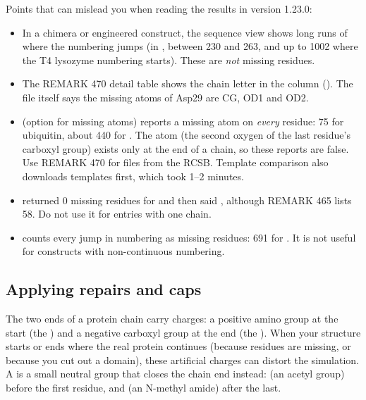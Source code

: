 \begin{watchout}
Points that can mislead you when reading the results in version 1.23.0:
\begin{itemize}
  \item In a chimera or engineered construct, the sequence view shows long
        runs of \prompt{-} where the numbering jumps (in , between
        230 and 263, and up to 1002 where the T4 lysozyme numbering starts).
        These are \emph{not} missing residues.
  \item The REMARK 470 detail table shows the chain letter in the
         column (). The file itself says the
        missing atoms of Asp29 are CG, OD1 and OD2.
  \item {} (option  for missing atoms) reports
        a missing  atom on \emph{every} residue: 75 for ubiquitin,
        about 440 for . The  atom (the second oxygen of the
        last residue's carboxyl group) exists only at the end of a chain, so
        these reports are false. Use REMARK 470 for files from the RCSB.
        Template comparison also downloads templates first, which took 1--2
        minutes.
  \item {} returned 0 missing residues for 
        and then said , although REMARK 465
        lists 58. Do not use it for entries with one chain.
  \item {} counts every jump in numbering as missing
        residues: 691 for . It is not useful for constructs with
        non-continuous numbering.
\end{itemize}
\end{watchout}

\subsection{Applying repairs and caps}
\label{sec:cleaning-caps}

The two ends of a protein chain carry charges: a positive amino group at the
start (the ) and a negative carboxyl group at the end (the
). When your structure starts or ends where the real protein
continues (because residues are missing, or because you cut out a domain),
these artificial charges can distort the simulation. A  is a small
neutral group that closes the chain end instead:  (an acetyl group)
before the first residue, and  (an N-methyl amide) after the last.

